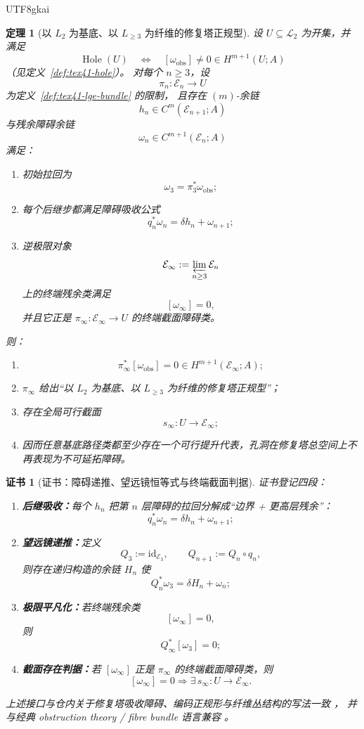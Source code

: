 \documentclass[12pt]{article}
\newtheorem{theorem}{定理}[section]
\newtheorem{Certificate}{证书}[section]
\newcommand{\Ltwo}{\mathcal{L}_2}
\newcommand{\Hole}{\operatorname{Hole}}
\newcommand{\id}{\mathrm{id}}
\begin{document}
\begin{CJK*}{UTF8}{gkai}
\begin{theorem}[以 $L_2$ 为基底、以 $L_{\ge 3}$ 为纤维的修复塔正规型]
\label{thm:tex41-repair-tower}
设 $U\subseteq \Ltwo$ 为开集，并满足
\[
  \Hole(U)
  \quad\Longleftrightarrow\quad
  [\omega_{\mathrm{obs}}]\neq 0
  \in H^{m+1}(U;A)
\]
（见定义~\ref{def:tex41-hole}）。
对每个 $n\ge 3$，设
\[
  \pi_n:\mathcal E_n\to U
\]
为定义~\ref{def:tex41-lge-bundle} 的限制，
且存在 $(m)$-余链
\[
  h_n\in C^m(\mathcal E_{n+1};A)
\]
与残余障碍余链
\[
  \omega_n\in C^{m+1}(\mathcal E_n;A)
\]
满足：
\begin{enumerate}
  \item 初始拉回为
  \[
    \omega_3=\pi_3^\ast\omega_{\mathrm{obs}};
  \]
  \item 每个后继步都满足障碍吸收公式
  \[
    q_n^\ast\omega_n=\delta h_n+\omega_{n+1};
  \]
  \item 逆极限对象
  \[
    \mathcal E_\infty:=\varprojlim_{n\ge 3}\mathcal E_n
  \]
  上的终端残余类满足
  \[
    [\omega_\infty]=0,
  \]
  并且它正是 $\pi_\infty:\mathcal E_\infty\to U$ 的终端截面障碍类。
\end{enumerate}
则：
\begin{enumerate}
  \item
  \[
    \pi_\infty^\ast[\omega_{\mathrm{obs}}]=0
    \in H^{m+1}(\mathcal E_\infty;A);
  \]
  \item $\pi_\infty$ 给出“以 $L_2$ 为基底、以 $L_{\ge 3}$ 为纤维的修复塔正规型”；
  \item 存在全局可行截面
  \[
    s_\infty:U\to\mathcal E_\infty;
  \]
  \item 因而任意基底路径类都至少存在一个可行提升代表，孔洞在修复塔总空间上不再表现为不可延拓障碍。
\end{enumerate}
\end{theorem}

\begin{Certificate}[证书：障碍递推、望远镜恒等式与终端截面判据]
\label{cert:tex41-repair-tower}
证书登记四段：
\begin{enumerate}
  \item \textbf{后继吸收：}每个 $h_n$ 把第 $n$ 层障碍的拉回分解成“边界 + 更高层残余”：
  \[
    q_n^\ast\omega_n=\delta h_n+\omega_{n+1};
  \]
  \item \textbf{望远镜递推：}定义
  \[
    Q_3:=\id_{\mathcal E_3},\qquad
    Q_{n+1}:=Q_n\circ q_n,
  \]
  则存在递归构造的余链 $H_n$ 使
  \[
    Q_n^\ast\omega_3=\delta H_n+\omega_n;
  \]
  \item \textbf{极限平凡化：}若终端残余类
  \[
    [\omega_\infty]=0,
  \]
  则
  \[
    Q_\infty^\ast[\omega_3]=0;
  \]
  \item \textbf{截面存在判据：}若 $[\omega_\infty]$ 正是 $\pi_\infty$ 的终端截面障碍类，则
  \[
    [\omega_\infty]=0
    \Rightarrow
    \exists\, s_\infty:U\to\mathcal E_\infty.
  \]
\end{enumerate}
上述接口与仓内关于修复塔吸收障碍、编码正规形与纤维丛结构的写法一致
\cite{RepoTex29RepairableObstruction,RepoTex35ExtendedCertificationTower,RepoTex36HomotopyTwistBijection}，
并与经典 obstruction theory / fibre bundle 语言兼容
\cite{Hatcher2002AT,Weibel1994HomologicalAlgebra,Husemoller1994FibreBundles}。
\end{Certificate}


\end{CJK*}
\end{document}
